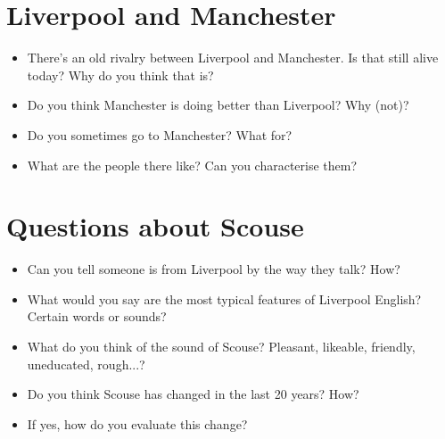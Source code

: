 	\section*{Liverpool and Manchester}
	\begin{multicols}{2}
		\begin{itemize}
			\item There's an old rivalry between Liverpool and Manchester. Is that still alive today? Why do you think that is?
			\item Do you think Manchester is doing better than Liverpool? Why (not)?
			\item Do you sometimes go to Manchester? What for?
			\item What are the people there like? Can you characterise them?
		\end{itemize}
	\end{multicols}
	
	\section*{Questions about Scouse}
	\begin{multicols}{2}
		\begin{itemize}
			\item Can you tell someone is from Liverpool by the way they talk? How?
			\item What would you say are the most typical features of Liverpool English? Certain words or sounds?
			\item What do you think of the sound of Scouse? Pleasant, likeable, friendly, uneducated, rough...?
			\item Do you think Scouse has changed in the last 20 years? How? 
			\item If yes, how do you evaluate this change?
		\end{itemize}		
	\end{multicols}